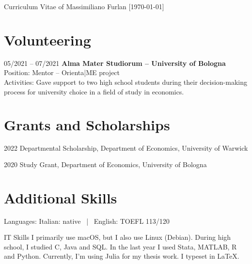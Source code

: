 \documentclass[11pt,a4paper]{article}
\begin{document}
\begin{cv}{\huge Curriculum Vitae of Massimiliano Furlan \large{[\today ]}}
\section{Volunteering}
\begin{cvlist}{}
	\item[05/2021 -- 07/2021]
		\textbf{Alma Mater Studiorum – University of Bologna}\\
		Position: Mentor -- Orienta|ME project\\
		Activities: Gave support to two high school students during their decision-making process for university choice in a field of study in economics.
\end{cvlist}
\vspace{-20pt}

\section{Grants and Scholarships}
\begin{cvlist}{}
	\itemsep -4pt
	\item[2022] Departmental Scholarship, Department of Economics, University of Warwick 
	\item[2020] Study Grant, Department of Economics, University of Bologna
\end{cvlist}


\section{Additional Skills}
\begin{cvlist}{}
	\item[Languages:] 
		Italian: native \ | \
		English: TOEFL 113/120
	\item[IT Skills] 
		I primarily use macOS, but I also use Linux (Debian). During high school, I studied C, Java and SQL. In the last year I used Stata, MATLAB, R and Python. Currently, I’m using Julia for my thesis work. I typeset in \LaTeX.
\end{cvlist}


\end{cv}
\end{document}
